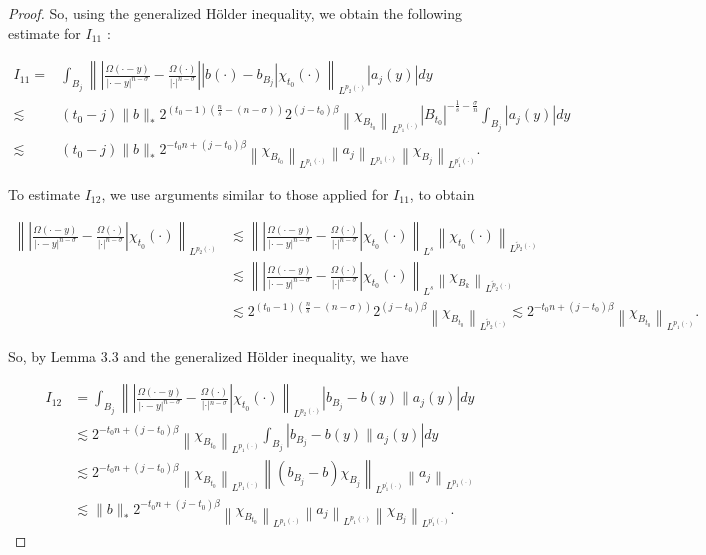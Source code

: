 \documentclass[oneside,reqno]{amsart}
\numberwithin{equation}{section}
\theoremstyle{definition}
\begin{document}
\begin{proof}
So, using the generalized Hölder inequality, we obtain the following estimate for $I_{11}$ :


\begin{align*}
I_{11}=&\int_{B_{j}}\left\|\left|\frac{\Omega(\cdot-y)}{|\cdot-y|^{n-\sigma}}-\frac{\Omega(\cdot)}{|\cdot|^{n-\sigma}}\right|\left|b(\cdot)-b_{B_{j}}\right| \chi_{t_0}(\cdot)\right\|_{L^{p_{2}(\cdot)}}\left|a_{j}(y)\right| d y \\
\lesssim & (t_0-j)\|b\|_{*} 2^{(t_0-1)\left(\frac{n}{s}-(n-\sigma)\right)} 2^{(j-t_0) \beta}\left\|\chi_{B_{t_0}}\right\|_{L^{p_{1}(\cdot)}}\left|B_{t_0}\right|^{-\frac{1}{s}-\frac{\sigma}{n}} \int_{B_{j}}\left|a_{j}(y)\right| d y  \\
\lesssim & (t_0-j)\|b\|_{*} 2^{-t_0n+(j-t_0) \beta}\left\|\chi_{B_{t_0}}\right\|_{L^{p_{1}(\cdot)}}\left\|a_{j}\right\|_{L^{p_{1}(\cdot)}}\left\|\chi_{B_{j}}\right\|_{L^{p_{1}^{\prime}(\cdot)}}.
\end{align*}


To estimate $I_{12}$, we use arguments similar to those applied for $I_{11}$, to obtain

$$
\begin{aligned}
 \left\|\left|\frac{\Omega(\cdot-y)}{|\cdot-y|^{n-\sigma}}-\frac{\Omega(\cdot)}{|\cdot|^{n-\sigma}}\right| \chi_{t_0}(\cdot)\right\|_{L^{p_{2}(\cdot)}} &\lesssim\left\|\left|\frac{\Omega(\cdot-y)}{|\cdot-y|^{n-\sigma}}-\frac{\Omega(\cdot)}{|\cdot|^{n-\sigma}}\right| \chi_{t_0}(\cdot)\right\|_{L^{s}} \left\|\chi_{t_0}(\cdot) \right\|_{L^{\tilde{p}_{2}(\cdot)}} \\
& \lesssim\left\|\left|\frac{\Omega(\cdot-y)}{|\cdot-y|^{n-\sigma}}-\frac{\Omega(\cdot)}{|\cdot|^{n-\sigma}}\right| \chi_{t_0}(\cdot)\right\|_{L^{s}} \left\|\chi_{B_k} \right\|_{L^{\tilde{p}_{2}(\cdot)}} \\
& \lesssim  2^{(t_0-1)\left(\frac{n}{s}-(n-\sigma)\right)} 2^{(j-t_0) \beta}\left\|\chi_{B_{t_0}}\right\|_{L^{\tilde{p}_{2}(\cdot)}} \lesssim  2^{-t_0n+(j-t_0) \beta}\left\|\chi_{B_{t_0}}\right\|_{L^{p_{1}(\cdot)}}.
\end{aligned}
$$

So, by Lemma $3.3$ and the generalized Hölder inequality, we have


\begin{align*}
I_{12}&=  \int_{B_{j}}\left\|\left|\frac{\Omega(\cdot-y)}{|\cdot-y|^{n-\sigma}}-\frac{\Omega(\cdot)}{|\cdot|{ }^{n-\sigma}}\right| \chi_{t_0}(\cdot)\right\|_{L^{p_{2}(\cdot)}}\left|b_{B_{j}}-b(y) \| a_{j}(y)\right| d y \\
& \lesssim  2^{-t_0n+(j-t_0) \beta}\left\|\chi_{B_{t_0}}\right\|_{L^{p_{1}(\cdot)}} \int_{B_{j}}\left|b_{B_{j}}-b(y) \| a_{j}(y)\right| d y \\
&\lesssim   2^{-t_0n+(j-t_0) \beta}\left\|\chi_{B_{t_0}}\right\|_{L^{p_{1}(\cdot)}}\left\|\left(b_{B_{j}}-b\right) \chi_{B_{j}}\right\|_{L^{p_{1}^{\prime}(\cdot)}}\left\|a_{j}\right\|_{L^{p_{1}(\cdot)}} \\
&\lesssim  \|b\|_{*} 2^{-t_0n+(j-t_0) \beta}\left\|\chi_{B_{t_0}}\right\|_{L^{p_{1}(\cdot)}}\left\|a_{j}\right\|_{L^{p_{1}(\cdot)}}\left\|\chi_{B_{j}}\right\|_{L^{p_{1}^{\prime}(\cdot)}}.
\end{align*}



\end{proof}
\end{document}
